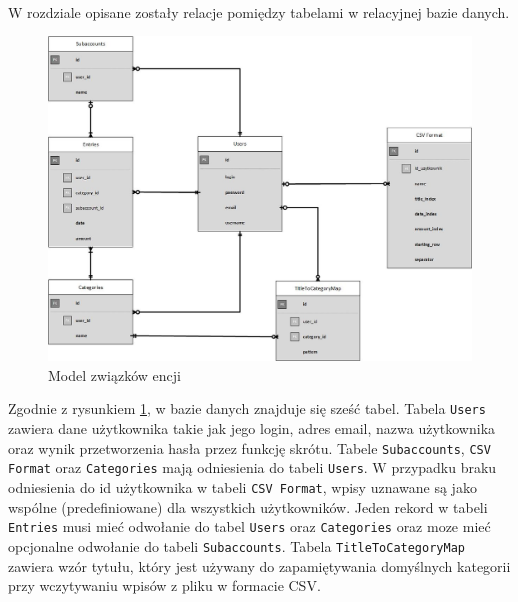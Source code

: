 \documentclass{article}
\begin{document}
	\paragraph{} W rozdziale opisane zostały relacje pomiędzy tabelami w relacyjnej bazie danych. 
	\begin{figure}[H]
		\centering
		\includegraphics[width=0.8\linewidth]{assets/er.jpg}
		\caption[]{Model związków encji}
		\label{fig:er}
	\end{figure}
	
	Zgodnie z rysunkiem \ref{fig:er}, w bazie danych znajduje się sześć tabel. Tabela \texttt{Users} zawiera dane użytkownika takie jak jego login, adres email, nazwa użytkownika oraz wynik przetworzenia hasła przez funkcję skrótu. Tabele \texttt{Subaccounts}, \texttt{CSV Format} oraz \texttt{Categories} mają odniesienia do tabeli \texttt{Users}. W przypadku braku odniesienia do id użytkownika w tabeli \texttt{CSV Format}, wpisy uznawane są jako wspólne (predefiniowane) dla wszystkich użytkowników. Jeden rekord w tabeli \texttt{Entries} musi mieć odwołanie do tabel \texttt{Users} oraz \texttt{Categories} oraz moze mieć opcjonalne odwołanie do tabeli \texttt{Subaccounts}. Tabela \texttt{TitleToCategoryMap} zawiera wzór tytułu, który jest używany do zapamiętywania domyślnych kategorii przy wczytywaniu wpisów z pliku w formacie CSV.
	
	
\end{document}
